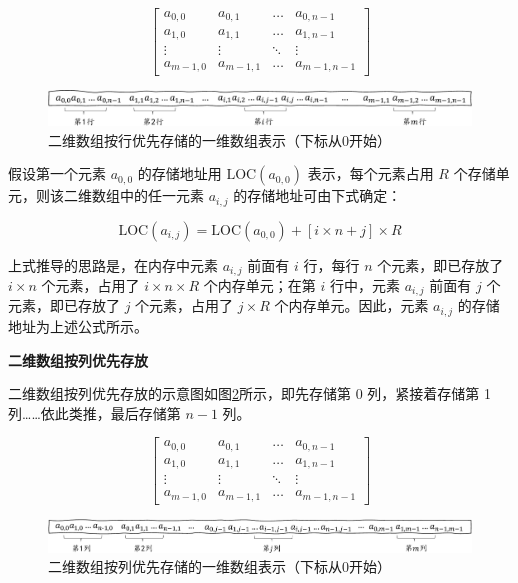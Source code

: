 \documentclass[lang=cn,newtx,10pt,scheme=chinese]{../elegantbook}
\begin{document}
\[
\begin{bmatrix}
a_{0,0} & a_{0,1} & \dots & a_{0,n-1} \\
a_{1,0} & a_{1,1} & \dots & a_{1,n-1} \\
\vdots & \vdots & \ddots & \vdots \\
a_{m-1,0} & a_{m-1,1} & \dots & a_{m-1,n-1}
\end{bmatrix}
\]

\begin{figure}[!htbp]
  \centering
  \includegraphics[width=1\textwidth]{./figure/pdf/cropped/rowFirst.pdf}
  \caption{二维数组按行优先存储的一维数组表示（下标从0开始）}
  \label{fig:row_major_array}
\end{figure}

假设第一个元素 $a_{0,0}$ 的存储地址用 $\text{LOC}(a_{0,0})$ 表示，每个元素占用 $R$ 个存储单元，则该二维数组中的任一元素 $a_{i,j}$ 的存储地址可由下式确定：

\begin{equation}
\text{LOC}(a_{i,j}) = \text{LOC}(a_{0,0}) + [i \times n + j] \times R
\end{equation}

上式推导的思路是，在内存中元素 $a_{i,j}$ 前面有 $i$ 行，每行 $n$ 个元素，即已存放了 $i \times n$ 个元素，占用了 $i \times n \times R$ 个内存单元；在第 $i$ 行中，元素 $a_{i,j}$ 前面有 $j$ 个元素，即已存放了 $j$ 个元素，占用了 $j \times R$ 个内存单元。因此，元素 $a_{i,j}$ 的存储地址为上述公式所示。

\textbf{二维数组按列优先存放}

二维数组按列优先存放的示意图如图\ref{fig:column_major_array}所示，即先存储第 0 列，紧接着存储第 1 列……依此类推，最后存储第 $n-1$ 列。

\[
\begin{bmatrix}
a_{0,0} & a_{0,1} & \dots & a_{0,n-1} \\
a_{1,0} & a_{1,1} & \dots & a_{1,n-1} \\
\vdots & \vdots & \ddots & \vdots \\
a_{m-1,0} & a_{m-1,1} & \dots & a_{m-1,n-1}
\end{bmatrix}
\]

\begin{figure}[!htbp]
  \centering
  \includegraphics[width=1\textwidth]{./figure/pdf/cropped/columnFirst.pdf}
  \caption{二维数组按列优先存储的一维数组表示（下标从0开始）}
  \label{fig:column_major_array}
\end{figure}
\end{document}
